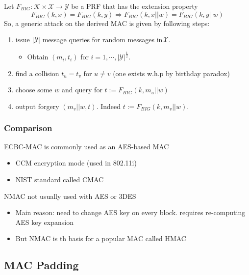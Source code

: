\documentclass[12pt]{book}
\begin{document}
Let $F_{BIG}:\mathcal{K}\times\mathcal{X}\rightarrow\mathcal{Y}$ be a PRF that has the extension property
$$F_{BIG}(k,x)=F_{BIG}(k,y)\Rightarrow F_{BIG}(k,x||w)=F_{BIG}(k,y||w)$$So, a generic attack on the derived MAC is given by following steps:
\begin{enumerate}
	\item issue $|\mathcal{Y}|$ message queries for random messages in$\mathcal{X}$.
	\begin{itemize}
		\item Obtain $(m_{i},t_{i})$ for $i=1,\cdots,|\mathcal{Y}|^{\frac{1}{2}}$.
	\end{itemize}
	\item find a collision $t_{u}=t_{v}$ for $u\neq v$ (one exists w.h.p by birthday paradox)
	\item choose some $w$ and query for $t:=F_{BIG}(k,m_{u}||w)$
	\item output forgery $(m_{v}||w,t)$. Indeed $t:=F_{BIG}(k,m_{v}||w)$.
\end{enumerate}

\subsubsection{Comparison}
ECBC-MAC is commonly used as an AES-based MAC
\begin{itemize}
	\item CCM encryption mode (used in 802.11i)
	\item NIST standard called CMAC
\end{itemize}

NMAC not usually used with AES or 3DES
\begin{itemize}
	\item Main reason: need to change AES key on every block. requires re-computing AES key expansion
	\item But NMAC is th basis for a popular MAC called HMAC
\end{itemize}

\subsection{MAC Padding}
\end{document}
